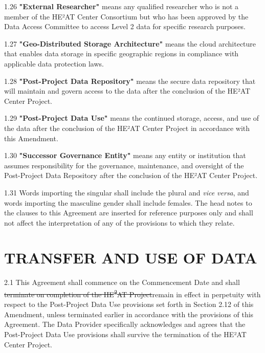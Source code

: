 \documentclass[12pt,letterpaper]{article}
\newcommand{\deleted}[1]{\textcolor{deletecolor}{\sout{#1}}}
\newcommand{\added}[1]{\textcolor{addcolor}{#1}}
\begin{document}
\added{1.26 \textbf{"External Researcher"} means any qualified researcher who is not a member of the HE²AT Center Consortium but who has been approved by the Data Access Committee to access Level 2 data for specific research purposes.}

\added{1.27 \textbf{"Geo-Distributed Storage Architecture"} means the cloud architecture that enables data storage in specific geographic regions in compliance with applicable data protection laws.}

\added{1.28 \textbf{"Post-Project Data Repository"} means the secure data repository that will maintain and govern access to the data after the conclusion of the HE²AT Center Project.}

\added{1.29 \textbf{"Post-Project Data Use"} means the continued storage, access, and use of the data after the conclusion of the HE²AT Center Project in accordance with this Amendment.}

\added{1.30 \textbf{"Successor Governance Entity"} means any entity or institution that assumes responsibility for the governance, maintenance, and oversight of the Post-Project Data Repository after the conclusion of the HE²AT Center Project.}

1.31 Words importing the singular shall include the plural and \textit{vice versa}, and words importing the masculine gender shall include females. The head notes to the clauses to this Agreement are inserted for reference purposes only and shall not affect the interpretation of any of the provisions to which they relate.

\section{TRANSFER AND USE OF DATA}

2.1 This Agreement shall commence on the Commencement Date and shall \deleted{terminate on completion of the HE\textsuperscript{2}AT Project}\added{remain in effect in perpetuity with respect to the Post-Project Data Use provisions set forth in Section 2.12 of this Amendment, unless terminated earlier in accordance with the provisions of this Agreement. The Data Provider specifically acknowledges and agrees that the Post-Project Data Use provisions shall survive the termination of the HE²AT Center Project}.
\end{document}
